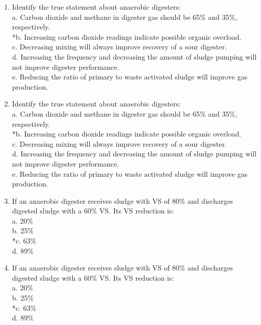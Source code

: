 \documentclass{article}
\begin{document}
\begin{enumerate}
\item  Identify the true statement about anaerobic digesters: \\

a. Carbon dioxide and methane in digester gas should be 65\% and 35\%, respectively. \\
*b. Increasing carbon dioxide readings indicate possible organic overload. \\
c. Decreasing mixing will always improve recovery of a sour digester. \\
d. Increasing the frequency and decreasing the amount of sludge pumping will not improve digester performance. \\
e. Reducing the ratio of primary to waste activated sludge will improve gas production. \\

\item  Identify the true statement about anaerobic digesters: \\

a. Carbon dioxide and methane in digester gas should be 65\% and 35\%, respectively. \\
*b. Increasing carbon dioxide readings indicate possible organic overload. \\
c. Decreasing mixing will always improve recovery of a sour digester. \\
d. Increasing the frequency and decreasing the amount of sludge pumping will not improve digester performance. \\
e. Reducing the ratio of primary to waste activated sludge will improve gas production. \\

\item  If an anaerobic digester receives sludge with VS of 80\% and discharges digested sludge with a 60\% VS.  Its VS reduction is: \\

a. 20\% \\
b. 25\% \\
*c. 63\% \\
d. 89\% \\

\item  If an anaerobic digester receives sludge with VS of 80\% and discharges digested sludge with a 60\% VS.  Its VS reduction is: \\

a. 20\% \\
b. 25\% \\
*c. 63\% \\
d. 89\% \\


\end{enumerate}
\end{document}
